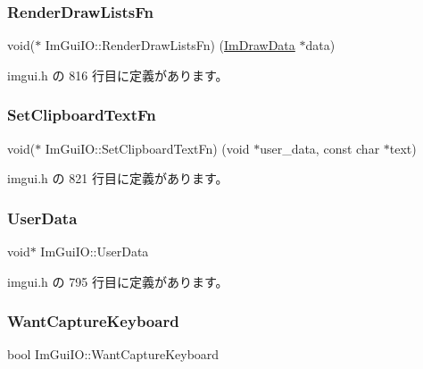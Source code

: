 \subsubsection{\texorpdfstring{Render\+Draw\+Lists\+Fn}{RenderDrawListsFn}}
{\footnotesize\ttfamily void($\ast$ Im\+Gui\+I\+O\+::\+Render\+Draw\+Lists\+Fn) (\mbox{\hyperlink{struct_im_draw_data}{Im\+Draw\+Data}} $\ast$data)}



 imgui.\+h の 816 行目に定義があります。

\mbox{\label{struct_im_gui_i_o_a1ee9c0763df33f7f3a9819235ce85078}} 
\subsubsection{\texorpdfstring{Set\+Clipboard\+Text\+Fn}{SetClipboardTextFn}}
{\footnotesize\ttfamily void($\ast$ Im\+Gui\+I\+O\+::\+Set\+Clipboard\+Text\+Fn) (void $\ast$user\+\_\+data, const char $\ast$text)}



 imgui.\+h の 821 行目に定義があります。

\mbox{\label{struct_im_gui_i_o_a8c5e74fd39c2655455329e09529da7d3}} 
\subsubsection{\texorpdfstring{User\+Data}{UserData}}
{\footnotesize\ttfamily void$\ast$ Im\+Gui\+I\+O\+::\+User\+Data}



 imgui.\+h の 795 行目に定義があります。

\mbox{\label{struct_im_gui_i_o_a458e4ca98d896adb16e3a41ec6d2b811}} 
\subsubsection{\texorpdfstring{Want\+Capture\+Keyboard}{WantCaptureKeyboard}}
{\footnotesize\ttfamily bool Im\+Gui\+I\+O\+::\+Want\+Capture\+Keyboard}



